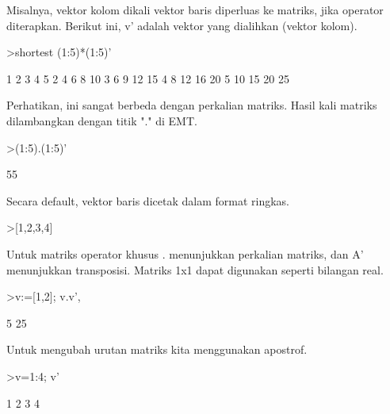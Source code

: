 \documentclass[a4paper,10pt]{article}
\begin{document}
\begin{eulernotebook}
\begin{eulercomment}
\begin{eulercomment}
\begin{eulercomment}
\begin{eulercomment}
\begin{eulercomment}
\begin{eulercomment}
\begin{eulercomment}
\begin{eulercomment}
\begin{eulercomment}
Misalnya, vektor kolom dikali vektor baris diperluas ke matriks, jika
operator diterapkan. Berikut ini, v' adalah vektor yang dialihkan
(vektor kolom).
\end{eulercomment}
\begin{eulerprompt}
>shortest (1:5)*(1:5)'
\end{eulerprompt}
\begin{euleroutput}
       1      2      3      4      5 
       2      4      6      8     10 
       3      6      9     12     15 
       4      8     12     16     20 
       5     10     15     20     25 
\end{euleroutput}
\begin{eulercomment}
Perhatikan, ini sangat berbeda dengan perkalian matriks. Hasil kali
matriks dilambangkan dengan titik "." di EMT.
\end{eulercomment}
\begin{eulerprompt}
>(1:5).(1:5)'
\end{eulerprompt}
\begin{euleroutput}
  55
\end{euleroutput}
\begin{eulercomment}
Secara default, vektor baris dicetak dalam format ringkas.
\end{eulercomment}
\begin{eulerprompt}
>[1,2,3,4]
\end{eulerprompt}
\begin{euleroutput}
  [1,  2,  3,  4]
\end{euleroutput}
\begin{eulercomment}
Untuk matriks operator khusus . menunjukkan perkalian matriks, dan A'
menunjukkan transposisi. Matriks 1x1 dapat digunakan seperti bilangan
real.
\end{eulercomment}
\begin{eulerprompt}
>v:=[1,2]; v.v', %
\end{eulerprompt}
\begin{euleroutput}
  5
  25
\end{euleroutput}
\begin{eulercomment}
Untuk mengubah urutan matriks kita menggunakan apostrof.
\end{eulercomment}
\begin{eulerprompt}
>v=1:4; v'
\end{eulerprompt}
\begin{euleroutput}
              1 
              2 
              3 
              4 
\end{euleroutput}

\end{eulercomment}
\end{eulercomment}
\end{eulercomment}
\end{eulercomment}
\end{eulercomment}
\end{eulercomment}
\end{eulercomment}
\end{eulercomment}
\end{eulernotebook}
\end{document}
